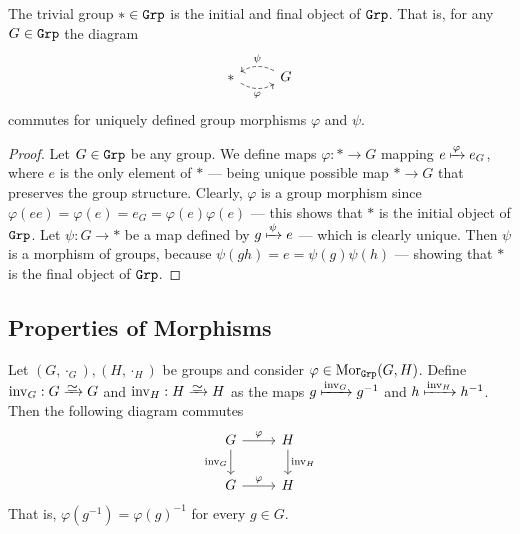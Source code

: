 \begin{proposition}
    The trivial group \(* \in {\texttt{Grp}}\) is the initial and final object of \({\texttt{Grp}}\).
    That is, for any \(G \in {\texttt{Grp}}\) the diagram
    \[
        \begin{tikzcd}
            * \ar[r, dashed, bend right, swap, "\varphi"]
            &G \ar[l, dashed, bend right, swap, "\psi"]
        \end{tikzcd}
    \]
    commutes for uniquely defined group morphisms \(\varphi\) and \(\psi\).
\end{proposition}

\begin{proof}
    Let \(G \in {\texttt{Grp}}\) be any group. We define maps \(\varphi: * \to G\) mapping
    \(e \xmapsto\varphi e_G\), where \(e\) is the only element of \(*\) --- being
    unique possible map \(* \to G\) that preserves the group structure. Clearly,
    \(\varphi\) is a group morphism since \(\varphi(e e) = \varphi(e) = e_G =
    \varphi(e) \varphi(e)\) --- this shows that \(*\) is the initial object of
    \({\texttt{Grp}}\). Let \(\psi: G \to *\) be a map defined by \(g \xmapsto\psi e\) ---
    which is clearly unique. Then \(\psi\) is a morphism of groups, because
    \(\psi(g h) = e = \psi(g) \psi(h)\) --- showing that \(*\) is the final object
    of \({\texttt{Grp}}\).
\end{proof}

\subsection{Properties of Morphisms}

\begin{proposition}
    \label{prop:grp-morphism-commute-inverse}
    Let \((G, \cdot_G), (H, \cdot_H)\) be groups and consider \(\varphi \in
    \operatorname{Mor}_{\texttt{Grp}}(G, H)\). Define \(\operatorname{inv}_G: G \isoto G\) and
    \(\operatorname{inv}_H: H \isoto H\) as the maps \(g \xmapsto
    {\operatorname{inv}_G} g^{-1}\) and \(h \xmapsto {\operatorname{inv}_H}
    h^{-1}\). Then the following diagram commutes
    \[
        \begin{tikzcd}
            G \ar[r, "\varphi"]
            \ar[d, swap, "\operatorname{inv}_G"]
            &H \ar[d, "\operatorname{inv}_H"] \\
            G \ar[r, "\varphi"] &H
        \end{tikzcd}
    \]
    That is, \(\varphi(g^{-1}) = \varphi(g)^{-1}\) for every \(g \in G\).
\end{proposition}

